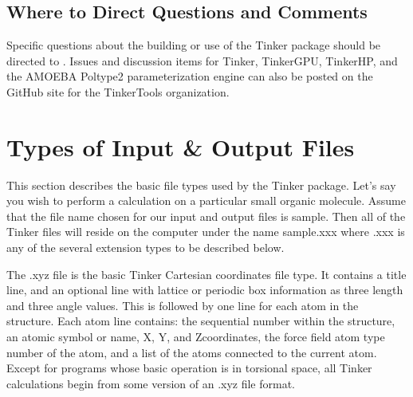 \documentclass[letterpaper,11pt,english]{sphinxmanual}
\begin{document}
\section{Where to Direct Questions and Comments}
\label{\detokenize{text/installation:where-to-direct-questions-and-comments}}
\sphinxAtStartPar
Specific questions about the building or use of the Tinker package should be directed to . Issues and discussion items for Tinker, Tinker\sphinxhyphen{}GPU, Tinker\sphinxhyphen{}HP, and the AMOEBA Poltype2 parameterization engine can also be posted on the GitHub site for the TinkerTools organization.

\sphinxstepscope


\chapter{Types of Input \& Output Files}
\label{\detokenize{text/file-types:types-of-input-output-files}}\label{\detokenize{text/file-types::doc}}
\sphinxAtStartPar
This section describes the basic file types used by the Tinker package. Let’s say you wish to perform a calculation on a particular small organic molecule. Assume that the file name chosen for our input and output files is sample. Then all of the Tinker files will reside on the computer under the name sample.xxx where .xxx is any of the several extension types to be described below.

\sphinxAtStartPar
{}

\sphinxAtStartPar
The .xyz file is the basic Tinker Cartesian coordinates file type. It contains a title line, and an optional line with lattice or periodic box information as three length and three angle values. This is followed by one line for each atom in the structure. Each atom line contains: the sequential number within the structure, an atomic symbol or name, X\sphinxhyphen{}, Y\sphinxhyphen{}, and Z\sphinxhyphen{}coordinates, the force field atom type number of the atom, and a list of the atoms connected to the current atom. Except for programs whose basic operation is in torsional space, all Tinker calculations begin from some version of an .xyz file format.

\sphinxAtStartPar
{}
\end{document}
